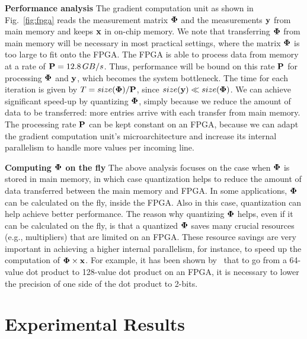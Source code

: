 \documentclass{article}
\begin{document}
{\bf Performance analysis} The gradient computation unit as shown in Fig.~\ref{fig:fpga} reads the measurement matrix ${\bf \Phi}$ and the measurements ${\bf y}$ from main memory and keeps ${\bf x}$ in on-chip memory. 
We note that transferring ${\bf \Phi}$ from main memory will be necessary in most practical settings, where the matrix ${\bf \Phi}$ is too large to fit onto the FPGA. 
The FPGA is able to process data from memory at a rate of ${\bf P}=12.8\,GB/s$. 
Thus, performance will be bound on this rate ${\bf P}$ for processing ${\bf \Phi}$ and ${\bf y}$, which becomes the system bottleneck. The time for each iteration is given by 
$T = size({\bf \Phi})/{\bf P}$, since $size({\bf y}) \ll size({\bf \Phi})$. 
We can achieve significant speed-up by quantizing ${\bf \Phi}$, simply because we reduce the amount of data to be transferred: more entries arrive with each transfer from main memory. 
The processing rate ${\bf P}$ can be kept constant on an FPGA, because we can adapt the gradient computation unit's microarchitecture and increase its internal parallelism to handle more values per incoming line. 

{\bf Computing ${\bf \Phi}$ on the fly} The above analysis focuses on the case when ${\bf \Phi}$ 
is stored in main memory, in which case quantization helps to reduce the amount of 
data transferred between the main memory and FPGA. In some applications, ${\bf \Phi}$
can be calculated on the fly, inside the FPGA. Also in this case, quantization can help 
achieve better performance.
The reason why quantizing ${\bf \Phi}$ helps, even if it can be calculated on the fly, is
that a quantized ${\bf \Phi}$ saves many crucial resources (e.g., multipliers) that
are limited on an FPGA. These resource savings are very important in achieving a higher 
internal parallelism, for instance, to speed up the computation of ${\bf \Phi}\times{\bf x}$. 
For example, it has been shown by~\cite{kara2017fpga} that to go from a 64-value dot product to 128-value
dot product on an FPGA, it is necessary to lower the precision of one side of the dot product to 2-bits.

\section{Experimental Results}\label{section_experiments}
\end{document}
